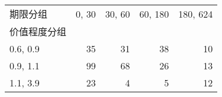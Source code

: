 \begin{tabular}{lrrrr}
\toprule
期限分组 &  0, 30 &  30, 60 &  60, 180 &  180, 624 \\
价值程度分组 &          &           &            &             \\
\midrule
0.6, 0.9    &       35 &        31 &         38 &          10 \\
0.9, 1.1    &       99 &        68 &         26 &          13 \\
1.1, 3.9    &       23 &         4 &          5 &          12 \\
\bottomrule
\end{tabular}
